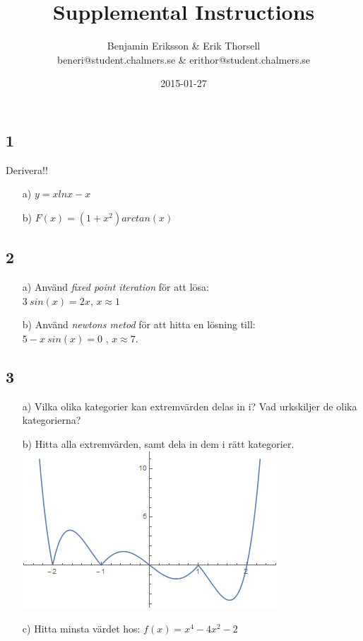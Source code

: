\documentclass{article}
\title{Supplemental Instructions}
\author{Benjamin Eriksson \& Erik Thorsell \\ 
		\small{beneri@student.chalmers.se} \&
		\small{erithor@student.chalmers.se}
}
\date{
      2015-01-27
     }
\begin{document}
\maketitle
\subsection*{1}
Derivera!!
\begin{itemize}
    \item[a) ] $y = x ln x -x$
    \item[b) ] $F(x) = (1+x^2)arctan(x)$ 
\end{itemize}

\subsection*{2}
\begin{itemize}
	\item[a) ] 	Använd \textit{fixed point iteration} för att lösa: \\
			 	$3 \> sin(x) = 2x$, $x \approx 1$
	

	\item[b) ] 	Använd \textit{newtons metod} för att hitta en lösning till: \\
				$5 - x \> sin(x) = 0$ , $x \approx 7$. \\ 				   
	
\end{itemize}

\subsection*{3}
\begin{itemize}
\item[a) ] Vilka olika kategorier kan extremvärden delas in i? Vad urkskiljer de olika kategorierna? 
\item[b) ] Hitta alla extremvärden, samt dela in dem i rätt kategorier. \\
\includegraphics[scale=1]{eq}
\item[c) ] Hitta minsta värdet hos: $f(x) = x^4-4 x^2-2$

\end{itemize}
\end{document}
